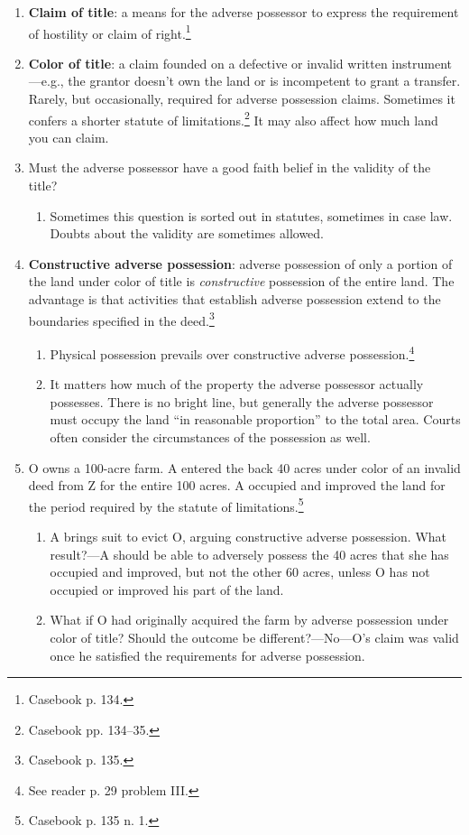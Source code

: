 \begin{enumerate}
    \item \textbf{Claim of title}: a means for the adverse possessor to 
    express the requirement of hostility or claim of right.\footnote{Casebook 
    p. 134.}
    \item \textbf{Color of title}: a claim founded on a defective or invalid 
    written instrument---e.g., the grantor doesn't own the land or is 
    incompetent to grant a transfer. Rarely, but occasionally, required for 
    adverse possession claims. Sometimes it confers a shorter statute of 
    limitations.\footnote{Casebook pp. 134--35.} It may also affect how much 
    land you can claim.
    \item Must the adverse possessor have a good faith belief in the validity 
    of the title?
    \begin{enumerate}
        \item Sometimes this question is sorted out in statutes, sometimes in 
        case law. Doubts about the validity are sometimes allowed.
    \end{enumerate}
    \item \textbf{Constructive adverse possession}: adverse possession of only 
    a portion of the land under color of title is \emph{constructive} 
    possession of the entire land. The advantage is that activities that 
    establish adverse possession extend to the boundaries specified in the 
    deed.\footnote{Casebook p. 135.}
    \begin{enumerate}
        \item Physical possession prevails over constructive adverse 
        possession.\footnote{See reader p. 29 problem III.}
        \item It matters how much of the property the adverse possessor 
        actually possesses. There is no bright line, but generally the adverse 
        possessor must occupy the land ``in reasonable proportion'' to the 
        total area. Courts often consider the circumstances of the possession 
        as well.
    \end{enumerate}
    \item O owns a 100-acre farm. A entered the back 40 acres under color of 
    an invalid deed from Z for the entire 100 acres. A occupied and improved 
    the land for the period required by the statute of 
    limitations.\footnote{Casebook p. 135 n. 1.}
    \begin{enumerate}
        \item A brings suit to evict O, arguing constructive adverse 
        possession. What result?---A should be able to adversely possess the 
        40 acres that she has occupied and improved, but not the other 
        60 acres, unless O has not occupied or improved his part of the land.
        \item What if O had originally acquired the farm by adverse possession 
        under color of title? Should the outcome be different?---No---O's 
        claim was valid once he satisfied the requirements for adverse 
        possession.
    \end{enumerate}
\end{enumerate}

